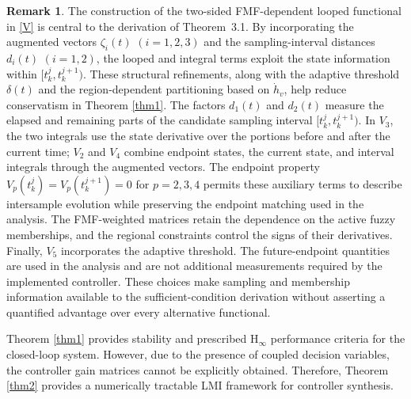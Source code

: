 \documentclass[preprint,review,fleqn,sort&compress,3p]{elsarticle}
\theoremstyle{definition} %
\theoremstyle{definition}%
\newtheorem{rem}{Remark}[section]
\begin{document}
\begin{rem}
The construction of the two-sided FMF-dependent looped functional in \eqref{V} is central to the derivation of Theorem~3.1.
By incorporating the augmented vectors $\zeta_i(t)$ $(i=1,2,3)$ and the sampling-interval distances $d_i(t)$ $(i=1,2)$, the looped and integral terms exploit the state information within $[t_k^j,t_k^{j+1})$.
These structural refinements, along with the adaptive threshold $\delta(t)$ and the region-dependent partitioning based on $\dot{h}_v$, help reduce conservatism in Theorem \ref{thm1}.
The factors $d_1(t)$ and $d_2(t)$ measure the elapsed and remaining parts of the candidate sampling interval $[t_k^j,t_k^{j+1})$. In $V_3$, the two integrals use the state derivative over the portions before and after the current time; $V_2$ and $V_4$ combine endpoint states, the current state, and interval integrals through the augmented vectors. The endpoint property $V_p(t_k^j)=V_p(t_k^{j+1})=0$ for $p=2,3,4$ permits these auxiliary terms to describe intersample evolution while preserving the endpoint matching used in the analysis. The FMF-weighted matrices retain the dependence on the active fuzzy memberships, and the regional constraints control the signs of their derivatives. Finally, $V_5$ incorporates the adaptive threshold. The future-endpoint quantities are used in the analysis and are not additional measurements required by the implemented controller. These choices make sampling and membership information available to the sufficient-condition derivation without asserting a quantified advantage over every alternative functional.
\end{rem}
Theorem \ref{thm1} provides stability and prescribed $\mathrm{H}_{\infty}$ performance criteria for the closed-loop system.
However, due to the presence of coupled decision variables, the controller gain matrices cannot be explicitly obtained. Therefore, Theorem \ref{thm2} provides a numerically tractable LMI framework for controller synthesis.
\end{document}
